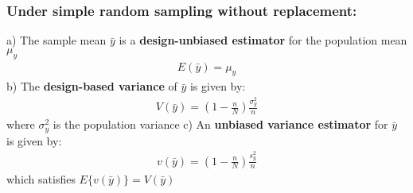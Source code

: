 \documentclass[a4paper,twoside,11pt]{article}
\begin{document}
{\subsubsection{Under simple random sampling without replacement:}
a) The sample mean $\bar y$ is a \textbf{design-unbiased estimator} for the population mean $\mu_y$
\begin{equation*}
\begin{aligned}
E(\bar{y}) = \mu_y
\end{aligned}
\end{equation*}
b) The \textbf{design-based variance} of $\bar{y}$ is given by:
\begin{equation*}
\begin{aligned}
V(\bar{y}) = (1-\frac{n}{N}) \frac{\sigma_y^2}{n}
\end{aligned}
\end{equation*}
\indent where $\sigma_y^2$ is the population variance
\newline
c) An \textbf{unbiased variance estimator} for $\bar{y}$ is given by:
\begin{equation*}
\begin{aligned}
v(\bar{y}) = (1-\frac{n}{N}) \frac{s_y^2}{n}
\end{aligned}
\end{equation*}
\indent which satisfies $E\{ v(\bar{y}) \} = V(\bar{y})$
}
\end{document}
